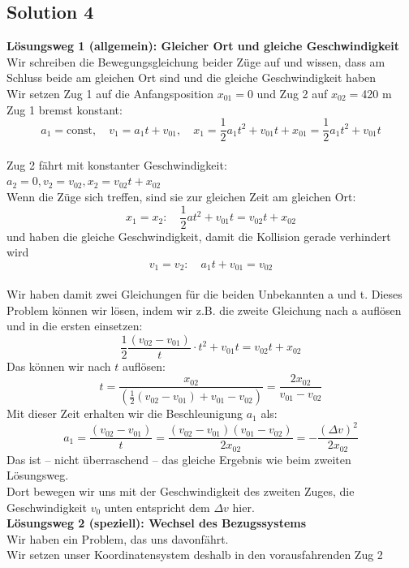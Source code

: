 \documentclass{article}
\begin{document}
\subsection*{Solution 4}
\textbf{Lösungsweg 1 (allgemein): Gleicher Ort und gleiche Geschwindigkeit}\\
Wir schreiben die Bewegungsgleichung beider Züge auf und wissen, dass am Schluss beide am gleichen Ort sind und die gleiche Geschwindigkeit haben\\Wir setzen Zug 1 auf die Anfangsposition $x_{01}=0$ und Zug 2 auf $x_{02}=$420 m\\Zug 1 bremst konstant: \[
a_1 = \text{const} \mathrm{,} \quad v_1 = a_1 t + v_{01} \mathrm{,} \quad x_1 = \frac{1}{2} a_1 t^2 + v_{01} t + x_{01} = \frac{1}{2} a_1 t^2 + v_{01} t
\]\\Zug 2 fährt mit konstanter Geschwindigkeit: \\
$a_2=0\mathrm{,} v_2=v_{02},x_2=v_{02} t+x_{02}$\\
Wenn die Züge sich treffen, sind sie zur gleichen Zeit am gleichen Ort:\\\[
x_1 = x_2 \mathrm{:} \quad \frac{1}{2} a t^2 + v_{01} t = v_{02} t + x_{02}
\]und haben die gleiche Geschwindigkeit, damit die Kollision gerade verhindert wird \[
v_1 = v_2 \mathrm{:} \quad a_1 t + v_{01} = v_{02}
\]\\Wir haben damit zwei Gleichungen für die beiden Unbekannten a und t. Dieses Problem können wir lösen, indem wir z.B. die zweite Gleichung nach a auflösen und in die ersten einsetzen: \\\[
\frac{1}{2} \frac{(v_{02} - v_{01})}{t} \cdot t^2 + v_{01} t = v_{02} t + x_{02}
\]Das können wir nach \( t \) auflösen:\[
t = \frac{x_{02}}{\left( \frac{1}{2}(v_{02} - v_{01}) + v_{01} - v_{02} \right)} = \frac{2x_{02}}{v_{01} - v_{02}}\]Mit dieser Zeit erhalten wir die Beschleunigung \( a_1 \) als:\[
a_1 = \frac{(v_{02} - v_{01})}{t} = \frac{(v_{02} - v_{01})(v_{01} - v_{02})}{2x_{02}} = -\frac{{(\Delta v)}^2}{2x_{02}}\]
Das ist – nicht überraschend – das gleiche Ergebnis wie beim zweiten Lösungsweg. \\
Dort bewegen wir uns mit der Geschwindigkeit des zweiten Zuges, die Geschwindigkeit \( v_0 \) unten entspricht dem \( \Delta v \) hier.\\
\textbf{Lösungsweg 2 (speziell): Wechsel des Bezugssystems}\\
Wir haben ein Problem, das uns davonfährt.\\
Wir setzen unser Koordinatensystem deshalb in den vorausfahrenden Zug 2\\
\end{document}

